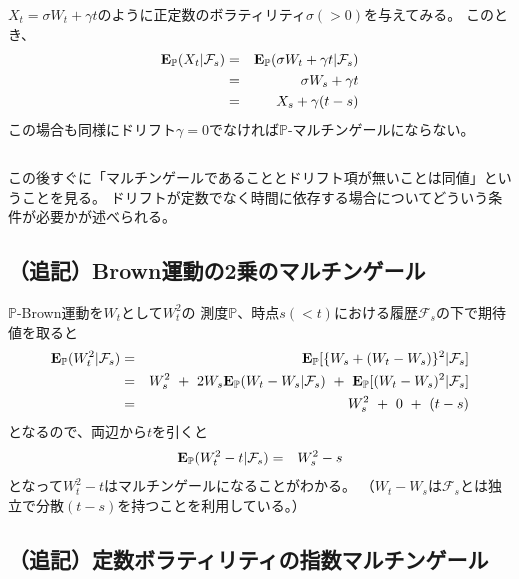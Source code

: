 \documentclass[uplatex,a4j,12pt,dvipdfmx]{jsarticle}
\begin{document}
$X_{t} = \sigma W_{t} + \gamma t$のように正定数のボラティリティ$\sigma(>0)$を与えてみる。
このとき、
%
\begin{eqnarray*}
	{\bf E}_{\mathbb{P}}( X_{t} | \mathcal{F}_{s} )
	&=&
	{\bf E}_{\mathbb{P}}( \sigma W_{t} + \gamma t | \mathcal{F}_{s} )
	\\ &=&
	\sigma W_{s}+ \gamma t
	\\ &=&
	X_{s} + \gamma  ( t - s )
\end{eqnarray*}
%
この場合も同様にドリフト$\gamma = 0$でなければ$\mathbb{P}$-マルチンゲールにならない。

${}$

この後すぐに「マルチンゲールであることとドリフト項が無いことは同値」ということを見る。
ドリフトが定数でなく時間に依存する場合についてどういう条件が必要かが述べられる。
\subsection{（追記）Brown運動の2乗のマルチンゲール}
$\mathbb{P}$-Brown運動を$W_{t}$として$W_{t}^{2}$の
測度$\mathbb{P}$、時点$s(<t)$における履歴$\mathcal{F}_{s}$の下で期待値を取ると
%
\begin{eqnarray*}
	{\bf E}_{\mathbb{P}}( W_{t}^{2} | \mathcal{F}_{s} )
	&=&
	{\bf E}_{\mathbb{P}}[ \{ W_{s} + (W_{t} - W_{s}) \}^{2} | \mathcal{F}_{s} ]
	\\ &=&
	W_{s}^{2}
	\ + \
	2 W_{s}
		{\bf E}_{\mathbb{P}}( W_{t} - W_{s} | \mathcal{F}_{s} )
	\ + \
	{\bf E}_{\mathbb{P}}[ ( W_{t} - W_{s} )^{2} | \mathcal{F}_{s} ]
	\\ &=&
	W_{s}^{2}
	\ + \
	0
	\ + \
	(t-s)
\end{eqnarray*}
%
となるので、両辺から$t$を引くと
%
\begin{eqnarray*}
	{\bf E}_{\mathbb{P}}( W_{t}^{2} - t | \mathcal{F}_{s} )
	&=&
	W_{s}^{2} - s
\end{eqnarray*}
%
となって$W_{t}^{2} - t$はマルチンゲールになることがわかる。
（$W_{t} - W_{s}$は$\mathcal{F}_{s}$とは独立で分散$(t-s)$を持つことを利用している。）

\subsection{（追記）定数ボラティリティの指数マルチンゲール}
\end{document}
